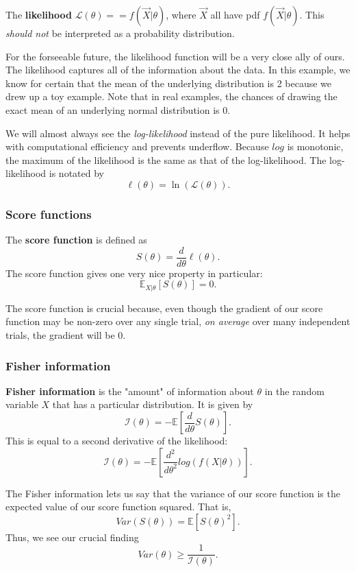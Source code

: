 \documentclass[titlepage, 12pt, leqno]{article}
\begin{document}
\begin{definition}
    The \textbf{likelihood} $\mathcal{L}(\theta) = = f(\vec X|\theta)$, where
    $\vec X$ all have pdf $f(\vec X|\theta)$. This \textit{should not} be 
    interpreted as a probability distribution.
\end{definition}
For the forseeable future, the likelihood function will be a very close ally of
ours. The likelihood captures all of the information about the data. In this
example, we know for certain that the mean of the underlying distribution is 2
because we drew up a toy example. Note that in real examples, the chances of 
drawing the exact mean of an underlying normal distribution is 0.

We will almost always see the \textit{log-likelihood} instead of the pure
likelihood. It helps with computational efficiency and prevents underflow. 
Because $log$ is monotonic, the maximum of the likelihood is the same as that
of the log-likelihood. The log-likelihood is notated by
\[
    \ell(\theta) = \ln(\mathcal{L}(\theta)).
\]
\subsubsection{Score functions}

\begin{definition}
    The \textbf{score function} is defined as
    \[
    S(\theta) = \frac{d}{d\theta}\ell(\theta).
    \]
    The score function gives one very nice property in particular:
    \[
        \mathbb{E}_{X|\theta}[S(\theta)] = 0.
    \]
\end{definition}
The score function is crucial because, even though the gradient of our score
function may be non-zero over any single trial, \textit{on average} over many
independent trials, the gradient will be 0.

\subsubsection{Fisher information}

\begin{definition}
    \textbf{Fisher information} is the "amount" of information about $\theta$
    in the random variable $X$ that has a particular distribution. It is given
    by
    \[
        \mathcal{I}(\theta) = -\mathbb{E}\left[\frac{d}{d\theta}
        S(\theta)\right].
    \]
    This is equal to a second derivative of the likelihood:
    \[
    \mathcal{I}(\theta) = -\mathbb{E}\left[\frac{d^{2}}{d\theta^{2}}
        log(f(X|\theta))\right].
    \]
\end{definition}
The Fisher information lets us say that the variance of our score function
is the expected value of our score function squared. That is,
\[
    Var(S(\theta)) = \mathbb{E}[S(\theta)^{2}].
\]
Thus, we see our crucial finding
\[
    \boxed{Var(\theta) \ge \frac{1}{\mathcal{I}(\theta)}}.
\]
\end{document}
